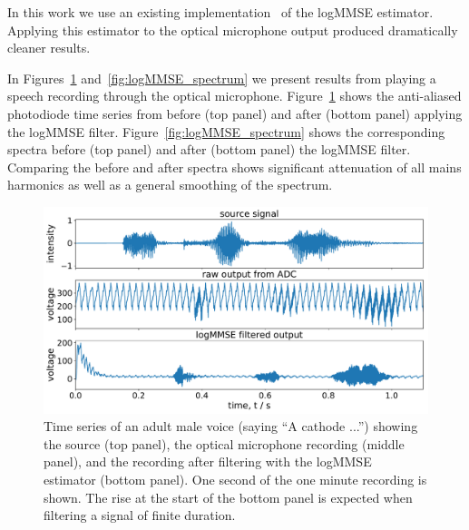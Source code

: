 \documentclass[paper-main.tex]{subfiles}
\begin{document}
In this work we use an existing implementation~\cite{logmmse} of the logMMSE estimator. 
Applying this estimator to the optical microphone output produced dramatically cleaner results. 

In Figures~\ref{fig:logMMSE_timeseries} and~\ref{fig:logMMSE_spectrum} we present results from playing a speech recording through the optical microphone. 
Figure~\ref{fig:logMMSE_timeseries} shows the anti-aliased photodiode time series from before (top panel) and after (bottom panel) applying the logMMSE filter. 
Figure~\ref{fig:logMMSE_spectrum} shows the corresponding spectra before (top panel) and after (bottom panel) the logMMSE filter. 
Comparing the before and after spectra shows significant attenuation of all mains harmonics as well as a general smoothing of the spectrum. 

\begin{figure}
	\includegraphics[width=\textwidth]{figures/combined_timeseries_melatos.pdf}
	\caption{Time series of an adult male voice (saying ``A cathode ...'') showing the source (top panel), the optical microphone recording (middle panel), and the recording after filtering with the logMMSE estimator (bottom panel). One second of the one minute recording is shown. The rise at the start of the bottom panel is expected when filtering a signal of finite duration.}
	\label{fig:logMMSE_timeseries}
\end{figure}
\end{document}
